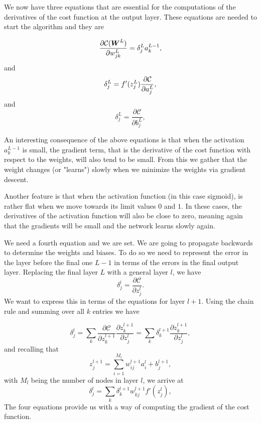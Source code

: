 We now have three equations that are essential for the computations of the derivatives of the cost function at the output layer.
These equations are needed to start the algorithm and they are

\begin{equation}
\frac{\partial\mathcal{C}({\boldsymbol{W}}^L)}{\partial w_{jk}^L}  =  \delta_j^La_k^{L-1},
\end{equation}
and
\begin{equation}
\delta_j^L = f'(z_j^L)\frac{\partial {\cal C}}{\partial a_j^L},
\end{equation}
and
\begin{equation}
\delta_j^L = \frac{\partial\mathcal{C}}{\partial b_j^L},
\end{equation}

\noindent An interesting consequence of the above equations is that when the
activation $a_k^{L-1}$ is small, the gradient term, that is the
derivative of the cost function with respect to the weights, will also
tend to be small. From this we gather that the weight changes (or "learns") slowly when we
minimize the weights via gradient descent. 

Another feature is that when the activation function (in this case sigmoid),
is rather flat when we move towards its limit values $0$ and $1$. In these
cases, the derivatives of the activation function will also be close
to zero, meaning again that the gradients will be small and the
network learns slowly again.

\noindent We need a fourth equation and we are set. We are going to propagate
backwards to determine the weights and biases. To do so we need to represent
the error in the layer before the final one $L-1$ in terms of the errors in the 
final output layer. Replacing the final layer $L$ with a general layer $l$, we have
$$\delta_j^l =\frac{\partial\mathcal{C}}{\partial z_j^l}.$$
We want to express this in terms of the equations for layer $l+1$.
Using the chain rule and summing over all $k$ entries we have

$$\delta_j^l =\sum_k \frac{\partial\mathcal{C}}{\partial z_k^{l+1}}\frac{\partial z_k^{l+1}}{\partial z_j^{l}}=\sum_k \delta_k^{l+1}\frac{\partial z_k^{l+1}}{\partial z_j^{l}},$$
and recalling that
$$z_j^{l+1} = \sum_{i=1}^{M_{l}}w_{ij}^{l+1}a_i^{l}+b_j^{l+1},$$
with $M_l$ being the number of nodes in layer $l$, we arrive at
\begin{equation}\label{eq:backprop-general}
	\delta_j^l =\sum_k \delta_k^{l+1}w_{kj}^{l+1}f'(z_j^l),
\end{equation}
The four equations provide us with a way of computing the gradient of the cost function.

